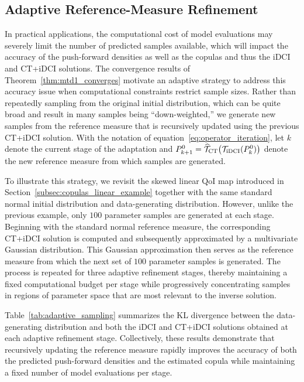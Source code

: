 \documentclass{article}
\newcounter{example}[section]
\begin{document}
\subsection{Adaptive Reference-Measure Refinement}\label{subsec:adaptive_measures}

In practical applications, the computational cost of model evaluations may severely limit the number of predicted samples available, which will impact the accuracy of the push-forward densities as well as the copulas and thus the iDCI and CT+iDCI solutions.
The convergence results of Theorem~\ref{thm:mtd1_converges} motivate an adaptive strategy to address this accuracy issue when computational constraints restrict sample sizes.
Rather than repeatedly sampling from the original initial distribution, which can be quite broad and result in many samples being ``down-weighted,'' we generate new samples from the reference measure that is recursively updated using the previous CT+iDCI solution.
With the notation of equation~\eqref{eq:operator_iteration}, let $k$ denote the current stage of the adaptation and $P_{k+1}^0
=
\widehat{\mathcal T}_{\rm CT}
\!\left(
\mathcal T_{\rm iDCI}(P_k^0)
\right)$ denote the new reference measure from which samples are generated.

To illustrate this strategy, we revisit the skewed linear QoI map introduced in Section~\ref{subsec:copulas_linear_example} together with the same standard normal initial distribution and data-generating distribution.
However, unlike the previous example, only $100$ parameter samples are generated at each stage.
Beginning with the standard normal reference measure, the corresponding CT+iDCI solution is computed and subsequently approximated by a multivariate Gaussian distribution.
This Gaussian approximation then serves as the reference measure from which the next set of $100$ parameter samples is generated.
The process is repeated for three adaptive refinement stages, thereby maintaining a fixed computational budget per stage while progressively concentrating samples in regions of parameter space that are most relevant to the inverse solution.

Table~\ref{tab:adaptive_sampling} summarizes the KL divergence between the data-generating distribution and both the iDCI and CT+iDCI solutions obtained at each adaptive refinement stage.
Collectively, these results demonstrate that recursively updating the reference measure rapidly improves the accuracy of both the predicted push-forward densities and the estimated copula while maintaining a fixed number of model evaluations per stage.
\end{document}
